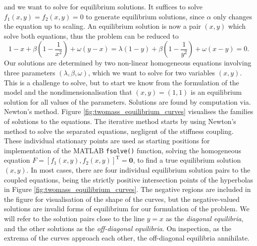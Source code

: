 \documentclass{report}
\begin{document}
and we want to solve for equilibrium solutions. It suffices to solve \(f_1(x,y) = f_2(x,y) = 0\) to generate equilibrium solutions,
since \(\alpha\) only changes the equation up to scaling. 
An equilibrium solution is now a pair \((x,y)\) which solve both equations,
thus the problem can be reduced to
\begin{equation}
    1-x + \beta\left(1 - \frac{1}{x^2}\right) + \omega(y-x) = \lambda(1-y) + \beta\left(1 - \frac{1}{y^2}\right) + \omega(x-y) = 0.
    \label{eqn:twomass_noalpha_equilibrium_solutions}
\end{equation}
Our solutions are determined by two non-linear homogeneous equations involving three parameters \((\lambda, \beta, \omega)\), which we want to solve for two variables \((x,y)\).
This is a challenge to solve, but to start we know from the formulation of the model and the nondimensionalisation that \((x,y) = (1,1)\) is an equilibrium solution for all values of the parameters.
Solutions are found by computation via. Newton's method.
Figure \ref{fig:twomass_equilibrium_curves} visualises the families of solutions to the equations.
The iterative method starts by using Newton's method to solve the separated equations, negligent of the stiffness coupling.
These individual stationary points are used as starting positions for implementation of the MATLAB \texttt{fsolve()} function,
solving the homogeneous equation \(F = [f_1(x,y), f_2(x,y)]^\mathrm{T} = \mathbf{0}\),
to find a true equilibrium solution \((x,y)\).
In most cases, there are four individual equilibrium solution pairs to the coupled equations,
being the strictly positive intersection points of the hyperbolas in Figure \ref{fig:twomass_equilibrium_curves}.
The negative regions are included in the figure for visualisation of the shape of the curves,
but the negative-valued solutions are invalid forms of equilibrium for our formulation of the problem.
We will refer to the solution pairs close to the line $y=x$ as the \textit{diagonal equilibria},
and the other solutions as the \textit{off-diagonal equilibria}.
On inspection, as the extrema of the curves approach each other,
the off-diagonal equilibria annihilate. %
\end{document}
